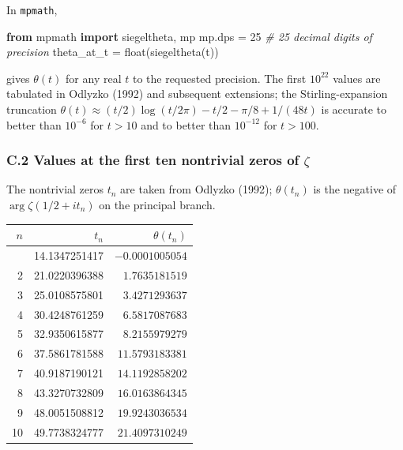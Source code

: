 \documentclass[
  letterpaper,
  11pt]{article}
\newenvironment{Shaded}{}{}
\newcommand{\BuiltInTok}[1]{\textcolor[rgb]{0.00,0.50,0.00}{#1}}
\newcommand{\CommentTok}[1]{\textcolor[rgb]{0.38,0.63,0.69}{\textit{#1}}}
\newcommand{\DecValTok}[1]{\textcolor[rgb]{0.25,0.63,0.44}{#1}}
\newcommand{\ImportTok}[1]{\textcolor[rgb]{0.00,0.50,0.00}{\textbf{#1}}}
\newcommand{\NormalTok}[1]{#1}
\newcommand{\OperatorTok}[1]{\textcolor[rgb]{0.40,0.40,0.40}{#1}}
\newcounter{none} %
\theoremstyle{plain}
\theoremstyle{definition}
\theoremstyle{remark}
\begin{document}
In \texttt{mpmath},

\begin{Shaded}
\begin{Highlighting}[]
\ImportTok{from}\NormalTok{ mpmath }\ImportTok{import}\NormalTok{ siegeltheta, mp}
\NormalTok{mp.dps }\OperatorTok{=} \DecValTok{25}                    \CommentTok{\# 25 decimal digits of precision}
\NormalTok{theta\_at\_t }\OperatorTok{=} \BuiltInTok{float}\NormalTok{(siegeltheta(t))}
\end{Highlighting}
\end{Shaded}

gives \(\theta(t)\) for any real \(t\) to the requested precision. The first \(10^{22}\) values are tabulated in Odlyzko (1992) and subsequent extensions; the Stirling-expansion truncation \(\theta(t) \approx (t/2)\log(t/2\pi) - t/2 - \pi/8 + 1/(48t)\) is accurate to better than \(10^{-6}\) for \(t > 10\) and to better than \(10^{-12}\) for \(t > 100\).

\subsubsection{\texorpdfstring{C.2 Values at the first ten nontrivial zeros of \(\zeta\)}{C.2 Values at the first ten nontrivial zeros of \textbackslash zeta}}\label{c.2-values-at-the-first-ten-nontrivial-zeros-of-zeta}

The nontrivial zeros \(t_n\) are taken from Odlyzko (1992); \(\theta(t_n)\) is the negative of \(\arg\zeta(1/2 + it_n)\) on the principal branch.

{\def\LTcaptype{none} %
\begin{longtable}[]{@{}rrr@{}}
\toprule\noalign{}
\(n\) & \(t_n\) & \(\theta(t_n)\) \\
\midrule\noalign{}
\endhead
\bottomrule\noalign{}
\endlastfoot
1 & 14.1347251417 & \(-0.0001005054\) \\
2 & 21.0220396388 & \(1.7635181519\) \\
3 & 25.0108575801 & \(3.4271293637\) \\
4 & 30.4248761259 & \(6.5817087683\) \\
5 & 32.9350615877 & \(8.2155979279\) \\
6 & 37.5861781588 & \(11.5793183381\) \\
7 & 40.9187190121 & \(14.1192858202\) \\
8 & 43.3270732809 & \(16.0163864345\) \\
9 & 48.0051508812 & \(19.9243036534\) \\
10 & 49.7738324777 & \(21.4097310249\) \\
\end{longtable}
}
\end{document}
